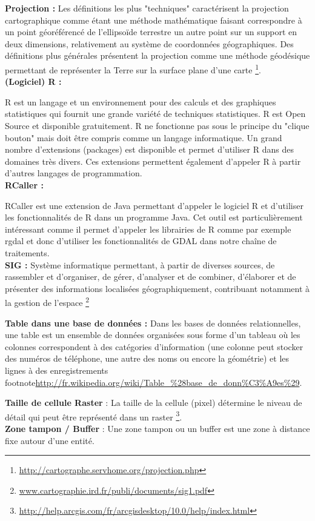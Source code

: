 \textbf{Projection : } Les définitions les plus "techniques" caractérisent la projection cartographique comme étant une méthode mathématique faisant correspondre à un point géoréférencé de l'ellipsoïde terrestre un autre point sur un support en deux dimensions, relativement au système de coordonnées géographiques. Des définitions plus générales présentent la projection comme une méthode géodésique permettant de représenter la Terre sur la surface plane d'une carte \footnote{\url{http://cartographe.servhome.org/projection.php}}.\\ 

\textbf{(Logiciel) R : }

R est un langage et un environnement pour des calculs et des graphiques statistiques qui fournit une grande variété de techniques statistiques. R est Open Source et disponible gratuitement. R ne fonctionne pas sous le principe du "clique bouton" mais doit être compris comme un langage informatique. Un grand nombre d'extensions (packages) est disponible et permet d'utiliser R dans des domaines très divers. Ces extensions permettent également d'appeler R à partir d'autres langages de programmation.\\


\textbf{RCaller : }

RCaller est une extension de Java permettant d'appeler le logiciel R et d'utiliser les fonctionnalités de R dans un programme Java. Cet outil est particulièrement intéressant comme il permet d'appeler les librairies de R comme par exemple rgdal et donc d'utiliser les fonctionnalités de GDAL dans notre chaîne de traitements.\\

\textbf{SIG : }Système informatique permettant, à partir de diverses sources, de rassembler et d'organiser, de gérer, d'analyser et de combiner, d'élaborer et de présenter des informations localisées géographiquement, contribuant notamment à la gestion de l'espace \footnote{\url{www.cartographie.ird.fr/publi/documents/sig1.pdf}}

\textbf{Table dans une base de données : }Dans les bases de données relationnelles, une table est un ensemble de données organisées sous forme d'un tableau où les colonnes correspondent à des catégories d'information (une colonne peut stocker des numéros de téléphone, une autre des noms ou encore la géométrie) et les lignes à des enregistrements footnote{\url{http://fr.wikipedia.org/wiki/Table_\%28base\_de\_donn\%C3\%A9es\%29}}.

\textbf{Taille de cellule Raster} : La taille de la cellule (pixel) détermine le niveau de détail qui peut être représenté dans un raster  \footnote{\url{http://help.arcgis.com/fr/arcgisdesktop/10.0/help/index.html}}.\\


\textbf{Zone tampon / Buffer} : Une zone tampon ou un buffer est une zone à distance fixe autour d'une entité.











